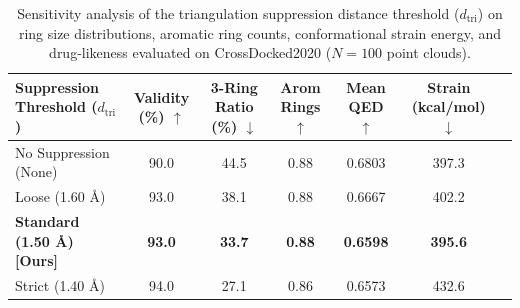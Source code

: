 
\begin{table}[t]
\centering
\small
\caption{Sensitivity analysis of the triangulation suppression distance threshold ($d_{\text{tri}}$) on ring size distributions, aromatic ring counts, conformational strain energy, and drug-likeness evaluated on CrossDocked2020 ($N=100$ point clouds).}
\label{tab:sensitivity_triangulation}
\begin{tabular}{lcccccc}
\toprule
\textbf{Suppression Threshold ($d_{\text{tri}}$)} & \textbf{Validity (\%)} $\uparrow$ & \textbf{3-Ring Ratio (\%)} $\downarrow$ & \textbf{Arom Rings} $\uparrow$ & \textbf{Mean QED} $\uparrow$ & \textbf{Strain (kcal/mol)} $\downarrow$ \\
\midrule
No Suppression (None) & 90.0 & 44.5 & 0.88 & 0.6803 & 397.3 \\
Loose (1.60 Å) & 93.0 & 38.1 & 0.88 & 0.6667 & 402.2 \\
\textbf{Standard (1.50 Å) [Ours]} & \textbf{93.0} & \textbf{33.7} & \textbf{0.88} & \textbf{0.6598} & \textbf{395.6} \\
Strict (1.40 Å) & 94.0 & 27.1 & 0.86 & 0.6573 & 432.6 \\
\bottomrule
\end{tabular}
\end{table}
